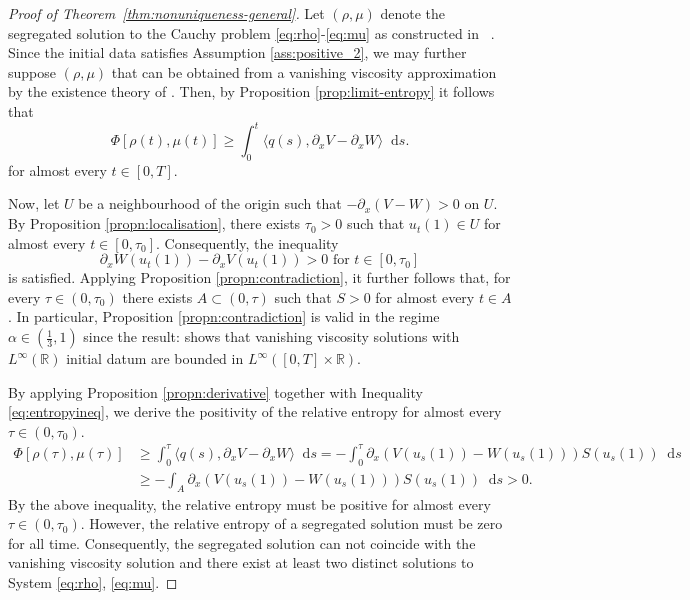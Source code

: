 \documentclass[a4paper,twosided, 11pt]{article}
\newcommand{\R}{\mathbb{R}}
\theoremstyle{plain}
\theoremstyle{remark}
\newcommand{\diff}{\mathop{} \mathrm{d}}
\numberwithin{equation}{section}
\begin{document}
\begin{proof}[Proof of Theorem~\ref{thm:nonuniqueness-general}]
     Let $(\rho,\mu)$ denote the segregated solution to the Cauchy problem \eqref{eq:rho}-\eqref{eq:mu} as constructed in ~\cite[Theorem 3.5]{santambrogioschulz2026segregated}. 
     Since the initial data satisfies Assumption \ref{ass:positive_2}, we may further suppose $(\rho,\mu)$ that can be obtained from a vanishing viscosity approximation by the existence theory of \cite[Theorem 1.3]{Skrzeczkowski2026crossdiffusion}. 
     Then, by Proposition \ref{prop:limit-entropy} it follows that 
$$
\Phi[\rho(t),\mu(t)]\ge \int_0^t \langle q(s),\partial_x V-\partial_x W\rangle\diff  s.
$$
for almost every $ t \in [0,T]$.

\medskip 

Now, let $U$ be a neighbourhood of the origin such that $-\partial_x (V-W) > 0$  on $U$.  
By Proposition \ref{propn:localisation}, there exists $\tau_0 > 0$ such that $u_t(1) \in U$ for almost every $t \in [0,\tau_0]$. 
Consequently, the inequality 
\[
\partial_x W(u_t(1)) -
\partial_x V(u_t(1))> 0 
\text{ for }  t\in [0,\tau_0]
\]
is satisfied.
Applying Proposition \ref{propn:contradiction}, it further follows that, for every $\tau \in (0,\tau_0)$ there exists $A \subset (0,\tau)$ such that $S> 0 $ for almost every $t \in A$.
In particular, Proposition \ref{propn:contradiction} is valid in the regime $\alpha  \in (\frac{1}{3},1)$ since the result: \cite[Theorem 1.3]{Skrzeczkowski2026crossdiffusion} shows that vanishing viscosity solutions with $L^\infty(\R)$ initial datum are bounded in $ L^\infty([0,T]\times \R)$.

\medskip 

By applying Proposition \ref{propn:derivative} together with Inequality \eqref{eq:entropyineq}, we derive the positivity of the relative entropy for almost every $\tau \in (0,\tau_0)$.
\begin{align*}
\Phi[\rho(\tau),\mu(\tau)] & \geq  \int_0^\tau \langle q(s),\partial_x V-\partial_x W\rangle\diff  s =  - \int_0^\tau \partial_x (V(u_s(1))-W(u_s(1)))S(u_s(1)) \diff s \\
& \geq - \int_A \partial_x (V(u_s(1))-W(u_s(1)))S(u_s(1)) \diff s > 0.  
\end{align*}
By the above inequality, the relative entropy must be positive for almost every $\tau \in (0,\tau_0)$. 
However, the relative entropy of a segregated solution must be zero for all time. 
Consequently, the segregated solution can not coincide with the vanishing viscosity solution and there exist at least two distinct solutions to System \eqref{eq:rho}, \eqref{eq:mu}.
\end{proof}
\end{document}
